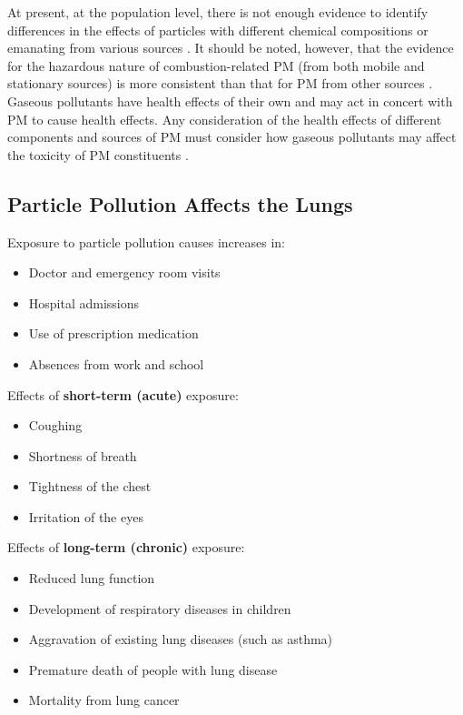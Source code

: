 \documentclass[11pt]{article}
\begin{document}
At present, at the population level, there is not enough evidence to identify differences in the effects of particles with different chemical compositions or emanating from various sources \citep{stanek2011attributing}. It should be noted, however, that the evidence for the hazardous nature of combustion-related PM (from both mobile and stationary sources) is more consistent than that for PM from other sources \citep{world2007health}. Gaseous pollutants have health effects of their own and may act in concert with PM to cause health effects. Any consideration of the health effects of different components and sources of PM must consider how gaseous pollutants may affect the toxicity of PM constituents \citep{adams2015particulate}.

\subsection{Particle Pollution Affects the Lungs}

Exposure to particle pollution causes increases in:
\begin{itemize}
    \item Doctor and emergency room visits
    \item Hospital admissions
    \item Use of prescription medication
    \item Absences from work and school
\end{itemize}

Effects of \textbf{short-term (acute)} exposure:
\begin{itemize}
    \item Coughing
    \item Shortness of breath
    \item Tightness of the chest
    \item Irritation of the eyes
\end{itemize}

Effects of \textbf{long-term (chronic)} exposure:
\begin{itemize}
    \item Reduced lung function
    \item Development of respiratory diseases in children
    \item Aggravation of existing lung diseases (such as asthma)
    \item Premature death of people with lung disease
    \item Mortality from lung cancer
\end{itemize}
\end{document}
